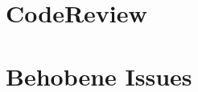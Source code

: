 \documentclass[11pt,a4paper]{article} %
\begin{document}
\section{CodeReview}


\section{Behobene Issues} \label{sec:issues}



\newpage



\end{document}
